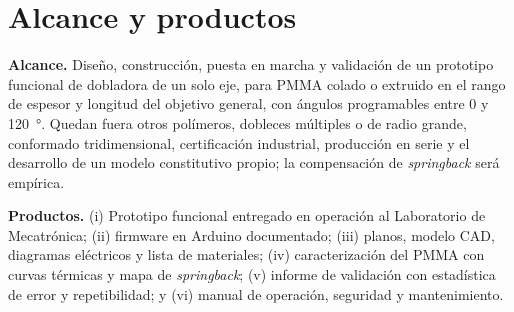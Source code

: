 \section{Alcance y productos}

\noindent\textbf{Alcance.} Diseño, construcción, puesta en marcha y validación de un prototipo funcional de dobladora de un solo eje, para PMMA colado o extruido en el rango de espesor y longitud del objetivo general, con ángulos programables entre \num{0} y \SI{120}{\degree}. Quedan fuera otros polímeros, dobleces múltiples o de radio grande, conformado tridimensional, certificación industrial, producción en serie y el desarrollo de un modelo constitutivo propio; la compensación de \emph{springback} será empírica.

\noindent\textbf{Productos.} (i) Prototipo funcional entregado en operación al Laboratorio de Mecatrónica; (ii) firmware en Arduino documentado; (iii) planos, modelo CAD, diagramas eléctricos y lista de materiales; (iv) caracterización del PMMA con curvas térmicas y mapa de \emph{springback}; (v) informe de validación con estadística de error y repetibilidad; y (vi) manual de operación, seguridad y mantenimiento.
